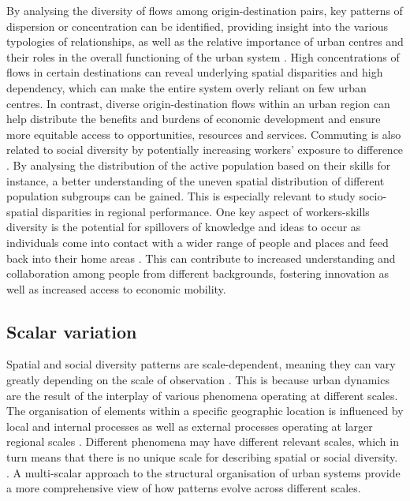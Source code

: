 \documentclass[11pt, a4paper]{article}
\begin{document}
By analysing the diversity of flows among origin-destination pairs, key patterns of dispersion or concentration can be identified, providing insight into the various typologies of relationships, as well as the relative importance of urban centres and their roles in the overall functioning of the urban system \citep{Goetz2010,Burger2014}. High concentrations of flows in certain destinations can reveal underlying spatial disparities and high dependency, which can make the entire system overly reliant on few urban centres. In contrast, diverse origin-destination flows within an urban region can help distribute the benefits and burdens of economic development and ensure more equitable access to opportunities, resources and services. Commuting is also related to social diversity by potentially increasing workers' exposure to difference \citep{Mare2019}. By analysing the distribution of the active population based on their skills for instance, a better understanding of the uneven spatial distribution of different population subgroups can be gained. This is especially relevant to study socio-spatial disparities in regional performance. One key aspect of workers-skills diversity is the potential for spillovers of knowledge and ideas to occur as individuals come into contact with a wider range of people and places and feed back into their home areas \citep{Goetz2010}. This can contribute to increased understanding and collaboration among people from different backgrounds, fostering innovation as well as increased access to economic mobility.


\subsection{Scalar variation}

Spatial and social diversity patterns are scale-dependent, meaning they can vary greatly depending on the scale of observation \citep{ Wu2004}. This is because urban dynamics are the result of the interplay of various phenomena operating at different scales. The organisation of elements within a specific geographic location is influenced by local and internal processes as well as external processes operating at larger regional scales \citep{Maciejewski2016, Rozenblat2022}. Different phenomena may have different relevant scales, which in turn means that there is no unique scale for describing spatial or social diversity. \citep{DeMontis2011, Boussauw2012}. A multi-scalar approach to the structural organisation of urban systems provide a more comprehensive view of how patterns evolve across different scales.
\end{document}
